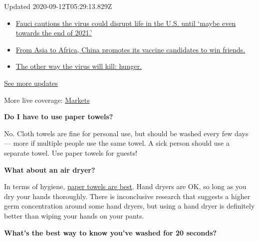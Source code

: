 Updated 2020-09-12T05:29:13.829Z

\begin{itemize}
\tightlist
\item
  \href{https://www.nytimes3xbfgragh.onion/2020/09/11/world/covid-19-coronavirus.html?action=click\&pgtype=Article\&state=default\&region=MAIN_CONTENT_1\&context=storylines_live_updates\#link-dfb8a16}{Fauci
  cautions the virus could disrupt life in the U.S. until `maybe even
  towards the end of 2021.'}
\item
  \href{https://www.nytimes3xbfgragh.onion/2020/09/11/world/covid-19-coronavirus.html?action=click\&pgtype=Article\&state=default\&region=MAIN_CONTENT_1\&context=storylines_live_updates\#link-7104d154}{From
  Asia to Africa, China promotes its vaccine candidates to win friends.}
\item
  \href{https://www.nytimes3xbfgragh.onion/2020/09/11/world/covid-19-coronavirus.html?action=click\&pgtype=Article\&state=default\&region=MAIN_CONTENT_1\&context=storylines_live_updates\#link-393ad215}{The
  other way the virus will kill: hunger.}
\end{itemize}

\href{https://www.nytimes3xbfgragh.onion/2020/09/11/world/covid-19-coronavirus.html?action=click\&pgtype=Article\&state=default\&region=MAIN_CONTENT_1\&context=storylines_live_updates}{See
more updates}

More live coverage:
\href{https://www.nytimes3xbfgragh.onion/live/2020/09/11/business/stock-market-today-coronavirus?action=click\&pgtype=Article\&state=default\&region=MAIN_CONTENT_1\&context=storylines_live_updates}{Markets}

\textbf{Do I have to use paper towels?}

No. Cloth towels are fine for personal use, but should be washed every
few days --- more if multiple people use the same towel. A sick person
should use a separate towel. Use paper towels for guests!

\textbf{What about an air dryer?}

In terms of hygiene,
\href{https://www.sciencedirect.com/science/article/abs/pii/S002561961200393X}{paper
towels are best}. Hand dryers are OK, so long as you dry your hands
thoroughly. There is inconclusive research that suggests a higher germ
concentration around some hand dryers, but using a hand dryer is
definitely better than wiping your hands on your pants.

\textbf{What's the best way to know you've washed for 20 seconds?}

